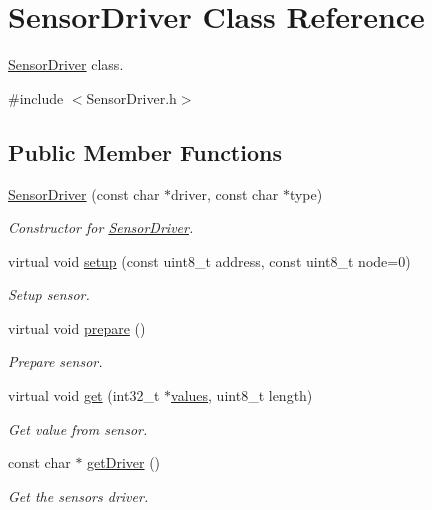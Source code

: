 \hypertarget{classSensorDriver}{}\section{Sensor\+Driver Class Reference}
\label{classSensorDriver}


\hyperlink{classSensorDriver}{Sensor\+Driver} class.  




{\ttfamily \#include $<$Sensor\+Driver.\+h$>$}

\subsection*{Public Member Functions}
\begin{DoxyCompactItemize}
\item 
\hyperlink{classSensorDriver_ab09b984c0201774e2e1eba23d2fb775d}{Sensor\+Driver} (const char $\ast$driver, const char $\ast$type)
\begin{DoxyCompactList}\small\item\em Constructor for \hyperlink{classSensorDriver}{Sensor\+Driver}. \end{DoxyCompactList}\item 
virtual void \hyperlink{classSensorDriver_ad6d2e1e9bf26944f102af3042ba1c615}{setup} (const uint8\+\_\+t address, const uint8\+\_\+t node=0)
\begin{DoxyCompactList}\small\item\em Setup sensor. \end{DoxyCompactList}\item 
virtual void \hyperlink{classSensorDriver_a19e0acad6518cf382fe7e71a7b915506}{prepare} ()
\begin{DoxyCompactList}\small\item\em Prepare sensor. \end{DoxyCompactList}\item 
virtual void \hyperlink{classSensorDriver_a2d9da1147c103028eff6756c3467f486}{get} (int32\+\_\+t $\ast$\hyperlink{classSensorDriver_a133e97d4b06f8b4d12265df0ac0bf9ed}{values}, uint8\+\_\+t length)
\begin{DoxyCompactList}\small\item\em Get value from sensor. \end{DoxyCompactList}\item 
const char $\ast$ \hyperlink{classSensorDriver_a5056f9f058d069b9840a6045c1a652d3}{get\+Driver} ()
\begin{DoxyCompactList}\small\item\em Get the sensor\textquotesingle{}s driver. \end{DoxyCompactList}\item 

\end{DoxyCompactItemize}
